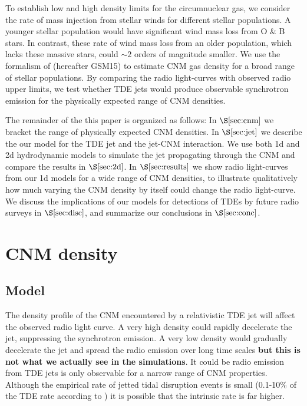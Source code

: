 \documentclass[usenatbib,fleqn]{mnras}
\begin{document}
To establish low and high density limits for the circumnuclear gas, we
consider the rate of mass injection from stellar winds for different
stellar populations. A younger stellar population would have
significant wind mass loss from O \& B stars. In contrast, these rate
of wind mass loss from an older population, which lacks these massive
stars, could $\sim 2$ orders of magnitude smaller. We use the
formalism of \citet{Generozov+2015} (hereafter GSM15) to estimate CNM
gas density for a broad range of stellar populations. By comparing the
radio light-curves with observed radio upper limits, we test whether
TDE jets would produce observable synchrotron emission for the
physically expected range of CNM densities.

The remainder of the this paper is organized as follows: In
$\S\ref{sec:cnm}$ we bracket the range of physically expected CNM
densities. In $\S\ref{sec:jet}$ we describe the our model for the TDE
jet and the jet-CNM interaction. We use both 1d and 2d hydrodynamic
models to simulate the jet propagating through the CNM and compare the
results in $\S\ref{sec:2d}$. In $\S\ref{sec:results}$ we show radio
light-curves from our 1d models for a wide range of CNM densities, to
illustrate qualitatively how much varying the CNM density by itself
could change the radio light-curve.  We discuss the implications of
our models for detections of TDEs by future radio surveys in
$\S\ref{sec:disc}$, and summarize our conclusions in
$\S\ref{sec:conc}$.

\section{CNM density}
\label{sec:cnm}

\subsection{Model}

The density profile of the CNM encountered by a relativistic TDE jet
will affect the observed radio light curve. A very high density could
rapidly decelerate the jet, suppressing the synchrotron emission. A
very low density would gradually decelerate the jet and spread the
radio emission over long time scales \citep{Mimica+2015} {\bf but this
is not what we actually see in the simulations}.  It could be 
radio emission from TDE jets is only observable for a narrow range of
CNM properties. Although the empirical rate of jetted tidal disruption
events is small (0.1-10\% of the TDE rate according to
\citealt{van-Velzen+2013}) it is possible that the intrinsic rate is
far higher.
\end{document}
